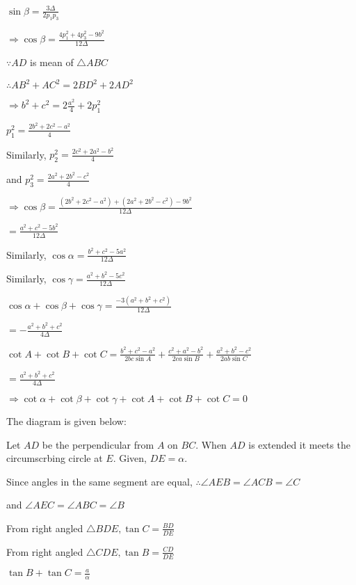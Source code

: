   $\sin\beta = \frac{3\Delta}{2p_1p_3}$

  $\Rightarrow \cos\beta = \frac{4p_1^2 + 4p_3^2 - 9b^2}{12\Delta}$

  $\because AD$ is mean of $\triangle ABC$

  $\therefore AB^2 + AC^2 = 2BD^2 + 2AD^2$

  $\Rightarrow b^2 + c^2 = 2\frac{a^2}{4} + 2p_1^2$

  $p_1^2 = \frac{2b^2 + 2c^2 - a^2}{4}$

  Similarly, $p_2^2 = \frac{2c^2 + 2a^2 - b^2}{4}$

  and $p_3^2 = \frac{2a^2 + 2b^2 - c^2}{4}$

  $\Rightarrow \cos\beta = \frac{(2b^2 + 2c^2 - a^2) + (2a^2 + 2b^2 - c^2) - 9b^2}{12\Delta}$

  $= \frac{a^2 + c^2 - 5b^2}{12\Delta}$

  Similarly, $\cos\alpha = \frac{b^2 + c^2 - 5a^2}{12\Delta}$

  Similarly, $\cos\gamma = \frac{a^2 + b^2 - 5c^2}{12\Delta}$

  $\cos\alpha + \cos\beta + \cos\gamma = \frac{-3(a^2 + b^2 + c^2)}{12\Delta}$

  $= -\frac{a^2 + b^2 + c^2}{4\Delta}$

  $\cot A + \cot B + \cot C = \frac{b^2 + c^2 - a^2}{2bc\sin A} + \frac{c^2 + a^2 - b^2}{2ca\sin B} + \frac{a^2 + b^2 -
    c^2}{2ab\sin C}$

  $= \frac{a^2 + b^2 + c^2}{4\Delta}$

  $\Rightarrow \cot\alpha + \cot\beta + \cot\gamma + \cot A + \cot B + \cot C = 0$

\item The diagram is given below:

  \startplacefigure
    \externalfigure[18_17.pdf]
  \stopplacefigure

  Let $AD$ be the perpendicular from $A$ on $BC.$ When $AD$ is extended it meets the circumscrbing circle
  at $E.$ Given, $DE=\alpha.$

  Since angles in the same segment are equal, $\therefore \angle AEB = \angle ACB = \angle C$

  and $\angle AEC = \angle ABC = \angle B$

  From right angled $\triangle BDE, \tan C = \frac{BD}{DE}$

  From right angled $\triangle CDE, \tan B = \frac{CD}{DE}$

  $\tan B + \tan C = \frac{a}{\alpha}$

